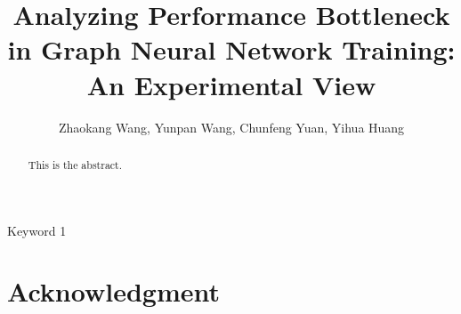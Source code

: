 \documentclass[review]{elsarticle}
\begin{document}
\begin{frontmatter}

\title{Analyzing Performance Bottleneck in Graph Neural Network Training: An Experimental View}
\author{Zhaokang Wang, Yunpan Wang, Chunfeng Yuan, Yihua Huang}
\address{State Key Laboratory for Novel Software Technology, Department of Computer Science and Technology, Nanjing University, Nanjing 210023, China}

\begin{abstract}
    This is the abstract.
\end{abstract}

\begin{keyword}
    Keyword 1
\end{keyword}

\end{frontmatter}

\linenumbers










\section*{Acknowledgment}


\end{document}
